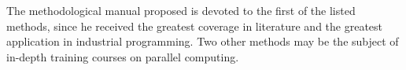 {\begin{enumerate}
	\end{enumerate}
	\par The methodological manual proposed is devoted to the first of the listed methods, since he received the greatest coverage in literature and the greatest application in industrial programming. Two other methods may be the subject of in-depth training courses on parallel computing.

}